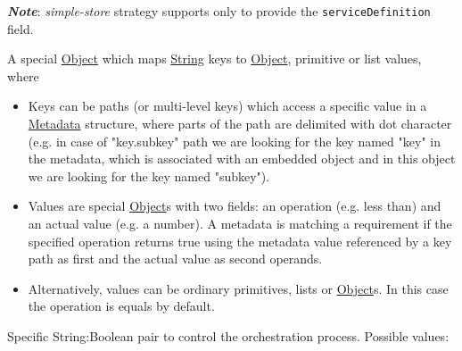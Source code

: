\documentclass[a4paper]{arrowhead}
\newcommand{\pdef}[1]{{\textcolor{ArrowheadGrey}{#1\label{sec:model:primitives:#1}\label{sec:model:primitives:#1s}\label{sec:model:primitives:#1es}}}}
\newcommand{\pref}[1]{{\textcolor{ArrowheadGrey}{\hyperref[sec:model:primitives:#1]{#1}}}}
\begin{document}
\textbf{\textit{Note}}: \textit{simple-store} strategy supports only to provide the \texttt{serviceDefinition} field. 


A special \pref{Object} which maps \pref{String} keys to \pref{Object}, primitive or list values, where 

\begin{itemize}
    \item Keys can be paths (or multi-level keys) which access a specific value in a \hyperref[sec:model:Metadata]{Metadata} structure, where parts of the path are delimited with dot character (e.g. in case of "key.subkey" path we are looking for the key named "key" in the metadata, which is associated with an embedded object and in this object we are looking for the key named "subkey").
    \item Values are special \pref{Object}s with two fields: an operation (e.g. less than) and an actual value (e.g. a number). A metadata is matching a requirement if the specified operation returns true using the metadata value referenced by a key path as first and the actual value as second operands. 
    \item Alternatively, values can be ordinary primitives, lists or \pref{Object}s. In this case the operation is equals by default.
\end{itemize}


Specific \pdef{String}:\pdef{Boolean} pair to control the orchestration process. Possible values:
\end{document}
